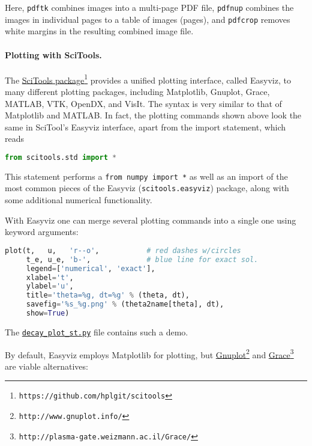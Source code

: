 \documentclass[graybox,sectrefs,envcountresetchap,open=right,final]{svmonodo}
\begin{document}
Here, \texttt{pdftk} combines images into a multi-page PDF file, \texttt{pdfnup}
combines the images in individual pages to a table of images (pages),
and \texttt{pdfcrop} removes white margins in the resulting combined image file.

\paragraph{Plotting with SciTools.}
The \href{{https://github.com/hplgit/scitools}}{SciTools package}\footnote{\texttt{https://github.com/hplgit/scitools}} provides a
unified plotting interface, called Easyviz, to many different plotting
packages, including Matplotlib, Gnuplot, Grace, MATLAB,
VTK, OpenDX, and VisIt. The syntax is very similar to that of
Matplotlib and MATLAB. In fact, the plotting commands shown above look
the same in SciTool's Easyviz interface, apart from the import
statement, which reads



\begin{lstlisting}[language=python,style=blue1_bluegreen]
from scitools.std import *

\end{lstlisting}

This statement performs a \texttt{from numpy import *} as well as an import
of the most common pieces of the Easyviz (\texttt{scitools.easyviz}) package,
along with some additional numerical functionality.

With Easyviz one can
merge several plotting commands into a single one
using keyword arguments:










\begin{lstlisting}[language=python,style=blue1_bluegreen]
plot(t,   u,   'r--o',           # red dashes w/circles
     t_e, u_e, 'b-',             # blue line for exact sol.
     legend=['numerical', 'exact'],
     xlabel='t',
     ylabel='u',
     title='theta=%g, dt=%g' % (theta, dt),
     savefig='%s_%g.png' % (theta2name[theta], dt),
     show=True)

\end{lstlisting}

The \href{{http://tinyurl.com/ofkw6kc/alg/decay_plot_st.py}}{\nolinkurl{decay_plot_st.py}} file
contains such a demo.

By default, Easyviz employs Matplotlib for plotting, but \href{{http://www.gnuplot.info/}}{Gnuplot}\footnote{\texttt{http://www.gnuplot.info/}} and \href{{http://plasma-gate.weizmann.ac.il/Grace/}}{Grace}\footnote{\texttt{http://plasma-gate.weizmann.ac.il/Grace/}} are viable alternatives:
\end{document}
